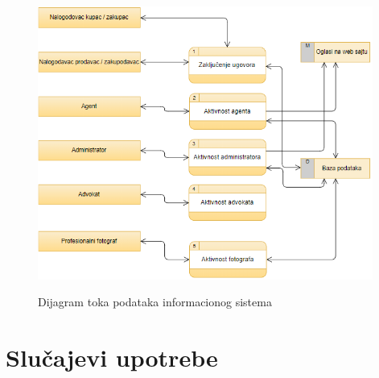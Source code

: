 \documentclass[20pt]{article}
\begin{document}
\begin{figure}[h]
        \centering
        \includegraphics[width=0.98\textwidth,height=0.5\textheight]{Pictures/DijagramTokaPodataka}\\
        \caption{Dijagram toka podataka informacionog sistema}
        \label{fig:dijagramTokaPodatakaIS}
    \end{figure}


\newpage
\section{\bfseries \Large Slu\v{c}ajevi upotrebe}
\setlength{\parindent}{1cm}
\fontsize{13}{18} \selectfont 
\end{document}
